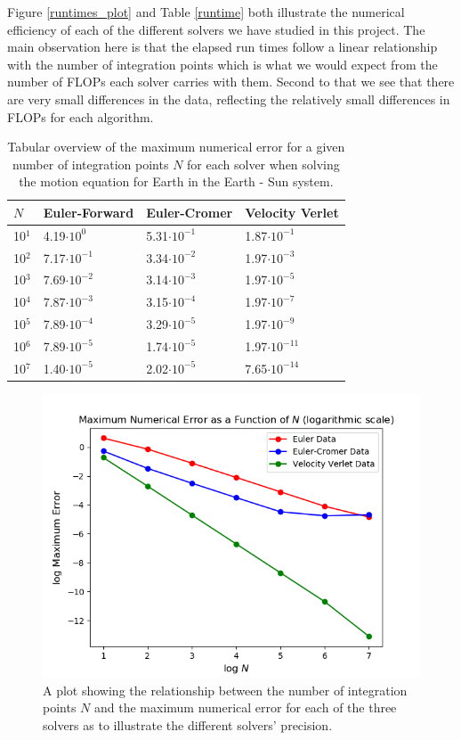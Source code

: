 	Figure \ref{runtimes_plot} and Table \ref{runtime} both illustrate the numerical efficiency of each of the different solvers we have studied in this project. The main observation here is that the elapsed run times follow a linear relationship with the number of integration points which is what we would expect from the number of FLOPs each solver carries with them. Second to that we see that there are very small differences in the data, reflecting the relatively small differences in FLOPs for each algorithm. 
	\newpage
	\begin{table}[H]
		\centering
		\caption{Tabular overview of the maximum numerical error for a given number of integration points $N$ for each solver when solving the motion equation for Earth in the Earth - Sun system.}
		\label{error}
		\begin{tabular}{l|l|l|l}
			$N$ & Euler-Forward & Euler-Cromer & Velocity Verlet\\
			\hline
			10$^1$ &4.19$\cdot10^0$ &5.31$\cdot10^{-1}$ & 1.87$\cdot10^{-1}$\\
			10$^2$ &7.17$\cdot10^{-1}$ &3.34$\cdot10^{-2}$ &1.97$\cdot10^{-3}$ \\
			10$^3$ &7.69$\cdot10^{-2}$ &3.14$\cdot10^{-3}$ &1.97$\cdot10^{-5}$ \\
			10$^4$ &7.87$\cdot10^{-3}$ &3.15$\cdot10^{-4}$ &1.97$\cdot10^{-7}$ \\
			10$^5$ & 7.89$\cdot10^{-4}$&3.29$\cdot10^{-5}$ &1.97$\cdot10^{-9}$ \\
			10$^6$ &7.89$\cdot10^{-5}$ &1.74$\cdot10^{-5}$ &1.97$\cdot10^{-11}$ \\
			10$^7$ &1.40$\cdot10^{-5}$ &2.02$\cdot10^{-5}$ & 7.65$\cdot10^{-14}$ 
		\end{tabular}
	\end{table}
	\begin{figure}[H]
		\includegraphics[width=\linewidth]{Figure/maxerrorplot_proj3.png}
		\caption{A plot showing the relationship between the number of integration points $N$ and the maximum numerical error for each of the three solvers as to illustrate the different solvers' precision. }
		\label{maxerror_plot}
	\end{figure}
	
